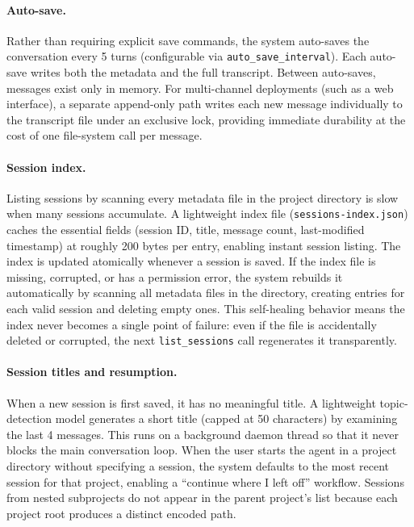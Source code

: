 \paragraph{Auto-save.} Rather than requiring explicit save commands, the system auto-saves the conversation every 5 turns (configurable via \texttt{auto\_save\_interval}). Each auto-save writes both the metadata and the full transcript. Between auto-saves, messages exist only in memory. For multi-channel deployments (such as a web interface), a separate append-only path writes each new message individually to the transcript file under an exclusive lock, providing immediate durability at the cost of one file-system call per message.

\paragraph{Session index.} Listing sessions by scanning every metadata file in the project directory is slow when many sessions accumulate. A lightweight index file (\texttt{sessions-index.json}) caches the essential fields (session ID, title, message count, last-modified timestamp) at roughly 200 bytes per entry, enabling instant session listing. The index is updated atomically whenever a session is saved. If the index file is missing, corrupted, or has a permission error, the system rebuilds it automatically by scanning all metadata files in the directory, creating entries for each valid session and deleting empty ones. This self-healing behavior means the index never becomes a single point of failure: even if the file is accidentally deleted or corrupted, the next \texttt{list\_sessions} call regenerates it transparently.

\paragraph{Session titles and resumption.} When a new session is first saved, it has no meaningful title. A lightweight topic-detection model generates a short title (capped at 50 characters) by examining the last 4 messages. This runs on a background daemon thread so that it never blocks the main conversation loop. When the user starts the agent in a project directory without specifying a session, the system defaults to the most recent session for that project, enabling a ``continue where I left off'' workflow. Sessions from nested subprojects do not appear in the parent project's list because each project root produces a distinct encoded path.

